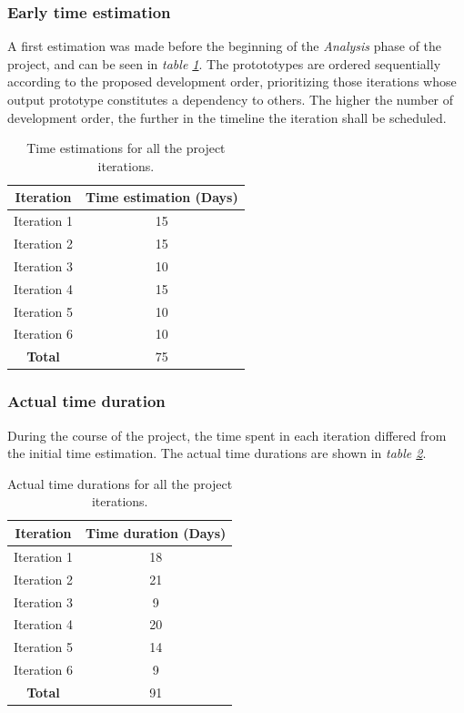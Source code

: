 \subsubsection{Early time estimation}

A first estimation was made before the beginning of the \emph{Analysis} phase of the project, and can be seen in \emph{table \ref{tab:firstTimeEstimation}}. 
The protototypes are ordered sequentially according to the proposed development order, prioritizing those iterations whose output
prototype constitutes a dependency to others. The higher the number of development order, the further in the timeline the 
iteration shall be scheduled.

\begin{table}[H]
	\centering
	\caption{Time estimations for all the project iterations.}
	\label{tab:firstTimeEstimation}
	\begin{tabular}{ | c | c |}
		\hline
		\textbf{Iteration} & \textbf{Time estimation (Days)} \\ \hline
        Iteration 1     & 15 \\ \hline
        Iteration 2     & 15 \\ \hline
        Iteration 3     & 10 \\ \hline
        Iteration 4     & 15 \\ \hline
        Iteration 5     & 10 \\ \hline
        Iteration 6     & 10 \\ \hline
        \textbf{Total}  & 75 \\ \hline
	\end{tabular}
\end{table}


\subsubsection{Actual time duration}

During the course of the project, the time spent in each iteration differed from the initial time estimation. The actual 
time durations are shown in \emph{table \ref{tab:actualTimeDurations}}.

\begin{table}[H]
    \centering
    \caption{Actual time durations for all the project iterations.}
    \label{tab:actualTimeDurations}
    \begin{tabular}{ | c | c |}
        \hline
        \textbf{Iteration} & \textbf{Time duration (Days)} \\ \hline
        Iteration 1     & 18 \\ \hline
        Iteration 2     & 21 \\ \hline
        Iteration 3     & 9 \\ \hline
        Iteration 4     & 20 \\ \hline
        Iteration 5     & 14 \\ \hline
        Iteration 6     & 9  \\ \hline
        \textbf{Total}  & 91  \\ \hline
    \end{tabular}
\end{table}

